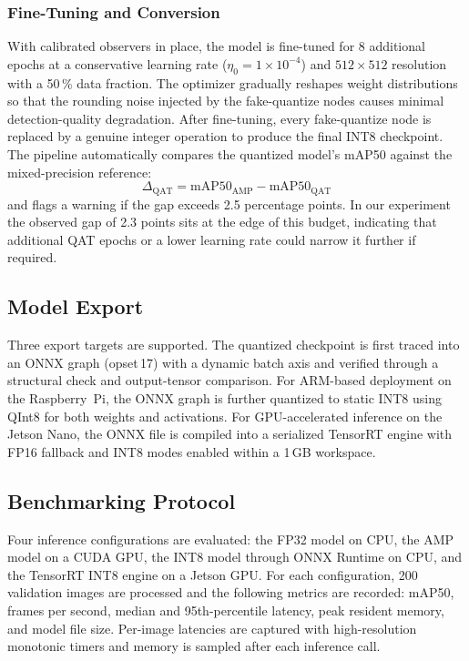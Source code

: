 \documentclass[conference]{IEEEtran}
\begin{document}
\subsubsection{Fine-Tuning and Conversion}
With calibrated observers in place, the model is fine-tuned for 8 additional epochs at a conservative learning rate ($\eta_0 = 1\times10^{-4}$) and $512{\times}512$ resolution with a 50\,\% data fraction. The optimizer gradually reshapes weight distributions so that the rounding noise injected by the fake-quantize nodes causes minimal detection-quality degradation. After fine-tuning, every fake-quantize node is replaced by a genuine integer operation to produce the final INT8 checkpoint. The pipeline automatically compares the quantized model's mAP50 against the mixed-precision reference:
\begin{equation}
\Delta_{\text{QAT}} = \text{mAP50}_{\text{AMP}} - \text{mAP50}_{\text{QAT}}
\label{eq:qat_delta}
\end{equation}
and flags a warning if the gap exceeds 2.5 percentage points. In our experiment the observed gap of 2.3 points sits at the edge of this budget, indicating that additional QAT epochs or a lower learning rate could narrow it further if required.

\subsection{Model Export}

Three export targets are supported. The quantized checkpoint is first traced into an ONNX graph (opset\,17) with a dynamic batch axis and verified through a structural check and output-tensor comparison. For ARM-based deployment on the Raspberry~Pi, the ONNX graph is further quantized to static INT8 using QInt8 for both weights and activations. For GPU-accelerated inference on the Jetson Nano, the ONNX file is compiled into a serialized TensorRT engine with FP16 fallback and INT8 modes enabled within a 1\,GB workspace.

\subsection{Benchmarking Protocol}

Four inference configurations are evaluated: the FP32 model on CPU, the AMP model on a CUDA GPU, the INT8 model through ONNX Runtime on CPU, and the TensorRT INT8 engine on a Jetson GPU. For each configuration, 200 validation images are processed and the following metrics are recorded: mAP50, frames per second, median and 95th-percentile latency, peak resident memory, and model file size. Per-image latencies are captured with high-resolution monotonic timers and memory is sampled after each inference call.
\end{document}
